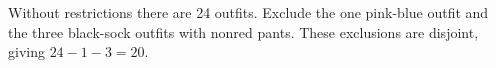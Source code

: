 Without restrictions there are 24 outfits. Exclude the one pink-blue outfit and the three black-sock outfits with nonred pants. These exclusions are disjoint, giving $ 24-1-3=\boxed{20}$.
